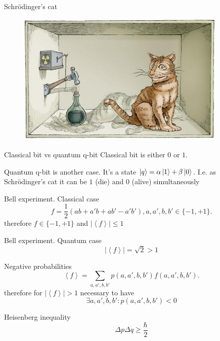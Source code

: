 \documentclass[10pt,pdf,hyperref={unicode}]{beamer}
\begin{document}
\begin{frame}{Schrödinger's cat}
 \begin{figure} 
   \includegraphics[width=100mm,scale=0.5]{catshred.jpg}
  \end{figure}
\end{frame}


\begin{frame}{Classical bit vs quantum q-bit}
  Classical bit is either $0$ or $1$.

  Quantum q-bit is another case. It's a state
  $\ket{q} = \alpha \ket{1} + \beta \ket{0}$. I.e. as Schrödinger's
  cat it can be $1$ (die) and $0$ (alive) simultaneously
\end{frame}


\begin{frame}{Bell experiment. Classical case}
\[
f = \frac{1}{2}\left(
a b + a' b + a b' - a' b'
\right), a,a',b,b' \in \{-1, +1\}.
\]
therefore
\(
f \in \{-1, +1\}
\)
and
\(
\left|\left<f\right>\right| \le 1
\)
\end{frame}

\begin{frame}{Bell experiment. Quantum case}
\[
\left|\left<f\right>\right| = \sqrt{2} > 1
\]
\end{frame}


\begin{frame}{Negative probabilities}
\[
\left<f\right> = \sum_{a,a',b,b'} p(a,a',b,b') f(a,a',b,b').
\]
therefore for $\left|\left<f\right>\right| > 1$ necessary to have
\[
\exists a,a',b,b': p(a,a',b,b') < 0
\]
\end{frame}

\begin{frame}{Heisenberg inequality}
  \[
  \Delta p \Delta q \ge \frac{\hbar}{2}
  \]
\end{frame}
\end{document}
